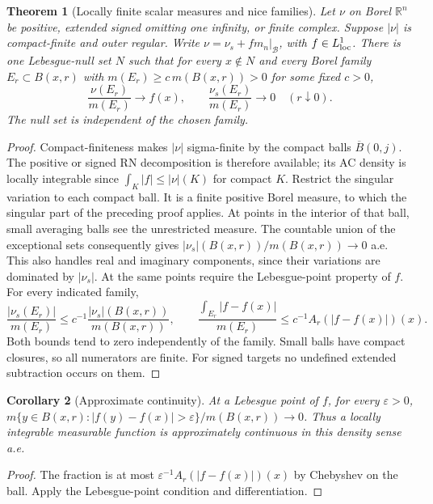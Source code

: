 \documentclass[11pt,oneside,openany]{book}
\newtheorem{theorem}{Theorem}[chapter]
\newtheorem{corollary}[theorem]{Corollary}
\theoremstyle{definition}
\theoremstyle{remark}
\newcommand{\R}{\mathbb R}\newcommand{\C}{\mathbb C}
\newcommand{\eps}{\varepsilon}\newcommand{\ee}{\varepsilon}
\newcommand{\BB}{\mathcal B}\newcommand{\SSS}{\mathcal S}
\newcommand{\family}[1]{}
\begin{document}
\begin{theorem}[Locally finite scalar measures and nice families]\family{D11.13.regular_measure_differentiation}\label{d11:13:regular-measure-differentiation}
Let $\nu$ on Borel $\R^n$ be positive, extended signed omitting one
infinity, or finite complex. Suppose $|\nu|$ is compact-finite and outer
regular. Write $\nu=\nu_s+f m_n|_{\BB}$, with $f\in L^1_{\rm loc}$.
There is one Lebesgue-null set $N$ such that for every $x\notin N$ and
every Borel family $E_r\subset B(x,r)$ with
$m(E_r)\geq c\,m(B(x,r))>0$ for some fixed $c>0$,
\[
 \frac{\nu(E_r)}{m(E_r)}\longrightarrow f(x),\qquad
 \frac{\nu_s(E_r)}{m(E_r)}\longrightarrow0 \quad(r\downarrow0).
\]
The null set is independent of the chosen family.
\end{theorem}
\begin{proof}
Compact-finiteness makes $|\nu|$ sigma-finite by the compact balls
$\overline B(0,j)$. The positive or signed RN decomposition is therefore
available; its AC density is locally integrable since
$\int_K|f|\leq|\nu|(K)$ for compact $K$. Restrict the singular variation
to each compact ball. It is a finite positive Borel measure, to which the
singular part of the preceding proof applies. At points in the interior
of that ball, small averaging balls see the unrestricted measure. The
countable union of the exceptional sets consequently gives
$|\nu_s|(B(x,r))/m(B(x,r))\to0$ a.e. This also handles real and imaginary
components, since their variations are dominated by $|\nu_s|$.
At the same points require the Lebesgue-point property of $f$.
For every indicated family,
\[
 \frac{|\nu_s(E_r)|}{m(E_r)}\leq c^{-1}
 \frac{|\nu_s|(B(x,r))}{m(B(x,r))},\qquad
 \frac{\int_{E_r}|f-f(x)|}{m(E_r)}\leq c^{-1}A_r(|f-f(x)|)(x).
\]
Both bounds tend to zero independently of the family. Small balls have
compact closures, so all numerators are finite. For signed targets no
undefined extended subtraction occurs on them.
\end{proof}

\begin{corollary}[Approximate continuity]\family{D11.13.approximate_continuity}\label{d11:13:approximate-continuity}
At a Lebesgue point of $f$, for every $\eps>0$,
$m\{y\in B(x,r):|f(y)-f(x)|>\eps\}/m(B(x,r))\to0$.
Thus a locally integrable measurable function is approximately continuous
in this density sense a.e.
\end{corollary}
\begin{proof}
The fraction is at most $\eps^{-1}A_r(|f-f(x)|)(x)$ by Chebyshev on
the ball. Apply the Lebesgue-point condition and differentiation.
\end{proof}
\end{document}
